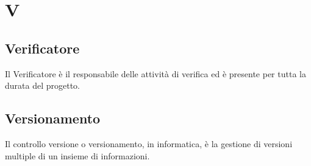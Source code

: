 \section{V}
	\subsection{Verificatore} 
		Il Verificatore è il responsabile delle attività di verifica ed è presente per tutta la durata del progetto.
	\subsection{Versionamento} 
		Il controllo versione o versionamento, in informatica, è la gestione di versioni multiple di un insieme di informazioni. 
